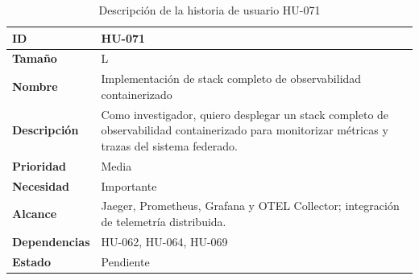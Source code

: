 \documentclass{report}
\begin{document}
\begin{table}[H]
\centering
\caption{Descripción de la historia de usuario HU-071}
\label{tab:hu071}
\begin{tabular}{|l|p{12cm}|}
\hline
\textbf{ID} & HU-071 \\ \hline
\textbf{Tamaño} & L \\ \hline
\textbf{Nombre} & Implementación de stack completo de observabilidad containerizado \\ \hline
\textbf{Descripción} &
Como investigador, quiero desplegar un stack completo de observabilidad containerizado para monitorizar métricas y trazas del sistema federado. \\ \hline
\textbf{Prioridad} & Media \\ \hline
\textbf{Necesidad} & Importante \\ \hline
\textbf{Alcance} &
Jaeger, Prometheus, Grafana y OTEL Collector; integración de telemetría distribuida. \\ \hline
\textbf{Dependencias} & HU-062, HU-064, HU-069\\ \hline
\textbf{Estado} & Pendiente \\ \hline
\end{tabular}
\end{table}

\newpage
\end{document}
